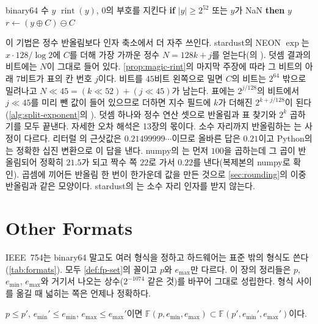\begin{algorithm}[htbp]
\begin{algorithmic}[1]
\Require binary64 수 $y$
\Ensure $\operatorname{rint}(y)$, $0$의 부호를 지킨다
\State \textbf{if} $|y|\ge2^{52}$ 또는 $y$가 NaN \textbf{then} \Return $y$ 
\State $r\gets(y\oplus C)\ominus C$ 
\State \Return {} 
\end{algorithmic}
\caption{덧셈으로 하는 짝수로의 반올림}
\label{alg:rint-magic}
\end{algorithm}

이 기법은 정수 반올림보다 인자 축소에서 더 자주 쓰인다. stardust의 NEON $\exp$는 $x\cdot128/\log2$에 $C$를 더해 가장 가까운 정수 $N=128k+j$를 얻는다(의 ). 덧셈 결과의 비트에는 $N$이 그대로 들어 있다. \cref{prop:magic-rint}의 마지막 주장에 따라 그 비트의 아래 $7$비트가 표의 칸 번호 $j$이다. 비트를 $45$비트 왼쪽으로 밀면 $C$의 비트는 $2^{64}$ 밖으로 밀려나고 $N\ll45=(k\ll52)+(j\ll45)$가 남는다. 표에는 $2^{j/128}$의 비트에서 $j\ll45$를 미리 뺀 값이 들어 있으므로 더하면 지수 필드에 $k$가 더해진 $2^{k+j/128}$이 된다(\cref{alg:split-exponent}의 ). 덧셈 하나와 정수 연산 셋으로 반올림과 표 찾기와 $2^k$ 곱하기를 모두 끝낸다. 자세한 오차 해석은 13장의 몫이다. 소수 자리까지 반올림하는 는 사정이 다르다. 리터럴 의 근삿값은 $0.21499999\cdots$이므로 올바른 답은 $0.21$이고 Python의 는 정확한 십진 변환으로 이 답을 낸다. numpy의 는 먼저 $100$을 곱하는데 그 곱이 반올림되어 정확히 $21.5$가 되고 짝수 쪽 $22$로 가서 $0.22$를 낸다(복제본의 numpy로 확인). 곱셈에 끼어든 반올림 한 번이 한가운데 값을 만든 것으로 \cref{sec:rounding}의 이중 반올림과 같은 모양이다. stardust의 는 소수 자리 인자를 받지 않는다.

\section{Other Formats}
\label{sec:other-formats}

IEEE~754는 binary64 말고도 여러 형식을 정하고 하드웨어는 표준 밖의 형식도 쓴다(\cref{tab:formats}). 모두 \cref{def:fp-set}의 꼴이고 $p$와 $e_{\max}$만 다르다. 이 장의 정리들은 $p$, $e_{\min}$, $e_{\max}$와 거기서 나오는 상수($2^{-1074}$ 같은 것)를 바꾸어 그대로 성립한다. 형식 사이를 옮길 때 넓히는 쪽은 언제나 정확하다.

\begin{proposition}
\label{prop:fp-widening}
$p\le p'$, $e_{\min}'\le e_{\min}$, $e_{\max}\le e_{\max}'$이면 $\mathbb F(p,e_{\min},e_{\max})\subset\mathbb F(p',e_{\min}',e_{\max}')$이다.
\end{proposition}

